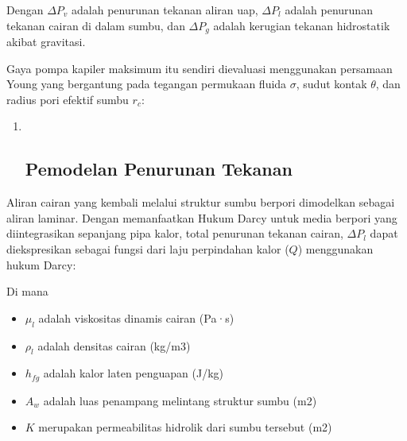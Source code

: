 \documentclass[
]{article}
\begin{document}
\href{https://www.codecogs.com/eqnedit.php?latex=\%5CDelta\%7B\%7DP_\%7Bcap\%2Cmax\%7D\%5Cgeq\%7B\%7D\%5CDelta\%7B\%7DP_\%7Bv\%7D\%2B\%5CDelta\%7B\%7DP_\%7Bl\%7D\%2B\%5CDelta\%7B\%7DP_\%7Bg\%7D\#0}{}

Dengan \(\Delta {P}_{v}\) adalah penurunan tekanan aliran uap,
\(\Delta {P}_{l}\) adalah penurunan tekanan cairan di dalam sumbu, dan
\(\Delta {P}_{g}\) adalah kerugian tekanan hidrostatik akibat gravitasi.

Gaya pompa kapiler maksimum itu sendiri dievaluasi menggunakan persamaan
Young yang bergantung pada tegangan permukaan fluida \(\sigma\), sudut
kontak \(\theta\), dan radius pori efektif sumbu \({r}_{c}\):

\href{https://www.codecogs.com/eqnedit.php?latex=\%5CDelta\%7B\%7DP_\%7Bcap\%2Cmax\%7D\%3D\%5Cfrac\%7B2\%5Csigma\%7B\%7D\%5Ccos\%7B\%5Ctheta\%7B\%7D\%7D\%7D\%7Br_\%7Bc\%7D\%7D\#0}{}

\begin{enumerate}
\def\labelenumi{\arabic{enumi}.}
\setcounter{enumi}{1}
\item ~
  \subsection{\texorpdfstring{\textbf{Pemodelan Penurunan
  Tekanan}}{Pemodelan Penurunan Tekanan}}\label{pemodelan-penurunan-tekanan}
\end{enumerate}

Aliran cairan yang kembali melalui struktur sumbu berpori dimodelkan
sebagai aliran laminar. Dengan memanfaatkan Hukum Darcy untuk media
berpori yang diintegrasikan sepanjang pipa kalor, total penurunan
tekanan cairan, \(\Delta {P}_{l}\) dapat diekspresikan sebagai fungsi
dari laju perpindahan kalor (\(Q\)) menggunakan hukum Darcy:

\href{https://saxarona.github.io/mathjax-viewer/?input=\%5CDelta\%7B\%7DP_\%7Bl\%7D\%3D\%5Cfrac\%7B\%5Cmu_\%7Bl\%7Dl_\%7Beff\%7DQ\%7D\%7B\%5Crho\%7B\%7D_\%7Bl\%7DKA_\%7Bw\%7Dh_\%7Bfg\%7D\%7D\#0}{}

Di mana

\begin{itemize}
\item
  \emph{\({\mu }_{l}\)} adalah viskositas dinamis cairan (Pa·s)
\item
  \({\rho }_{l}\) adalah densitas cairan (kg/m3)
\item
  \({h}_{fg}\) adalah kalor laten penguapan (J/kg)
\item
  \({A}_{w}\) adalah luas penampang melintang struktur sumbu (m2)
\item
  \(K\) merupakan permeabilitas hidrolik dari sumbu tersebut (m2)
\end{itemize}
\end{document}
